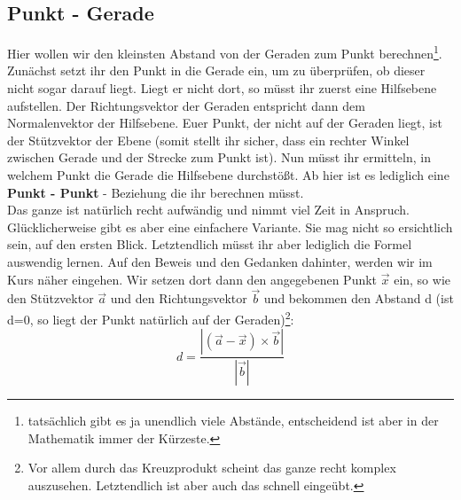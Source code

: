 \subsection{Punkt - Gerade}
	Hier wollen wir den kleinsten Abstand von der Geraden zum Punkt
	berechnen\footnote{tatsächlich gibt es ja unendlich viele Abstände,
	entscheidend ist aber in der Mathematik immer der Kürzeste.}.\\
	Zunächst setzt ihr den Punkt in die Gerade ein, um zu überprüfen, ob dieser
	nicht sogar darauf liegt. Liegt er nicht dort, so müsst ihr zuerst eine
	Hilfsebene aufstellen. Der Richtungsvektor der Geraden entspricht dann dem
	Normalenvektor der Hilfsebene. Euer Punkt, der nicht auf der Geraden liegt, ist
	der Stützvektor der Ebene (somit stellt ihr sicher, dass ein rechter Winkel
	zwischen Gerade und der Strecke zum Punkt ist). Nun müsst ihr ermitteln, in
	welchem Punkt die Gerade die Hilfsebene durchstößt. Ab hier ist es lediglich
	eine \textbf{Punkt - Punkt} - Beziehung die ihr berechnen müsst.\\
	Das ganze ist natürlich recht aufwändig und nimmt viel Zeit in Anspruch.
	Glücklicherweise gibt es aber eine einfachere Variante. Sie mag nicht so
	ersichtlich sein, auf den ersten Blick. Letztendlich müsst ihr aber lediglich
	die Formel auswendig lernen. Auf den Beweis und den Gedanken dahinter, werden
	wir im Kurs näher eingehen. Wir setzen dort dann den angegebenen Punkt
	\(\vec{x}\) ein, so wie den Stützvektor \(\vec{a}\) und den Richtungsvektor
	\(\vec{b}\) und bekommen den Abstand d (ist d=0, so liegt der Punkt natürlich
	auf der Geraden)\footnote{Vor allem durch das Kreuzprodukt scheint das ganze
	recht komplex auszusehen. Letztendlich ist aber auch das schnell eingeübt.}:
	\[d=\frac{|(\vec{a}-\vec{x})\times \vec{b}|}{|\vec{b}|}\]

